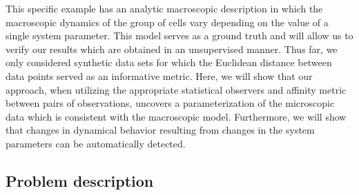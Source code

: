 \documentclass[preprint]{elsarticle}
\begin{document}
This specific example has an analytic macroscopic description in which the macroscopic dynamics of the group of cells vary depending on the value of a single system parameter.
%
This model serves as a ground truth and will allow us to verify our results which are obtained in an unsupervised manner.
%
Thus far, we only considered synthetic data sets for which the Euclidean distance between data points served as an informative metric. 
%
Here, we will show that our approach, when utilizing the appropriate statistical observers and affinity metric between pairs of observations, uncovers a parameterization of the microscopic data which is consistent with the macroscopic model.
%
Furthermore, we will show that changes in dynamical behavior resulting from changes in the system parameters can be automatically detected. 

%




\subsection{Problem description}
\end{document}
